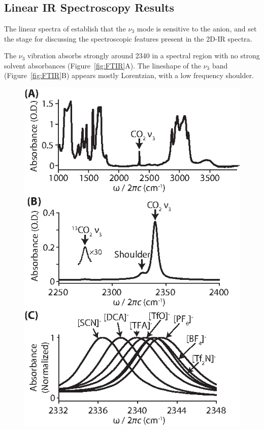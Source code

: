 {\section{\texorpdfstring{}{Results and Discussion}}

\subsection{Linear IR Spectroscopy Results}
\label{sec:anions_linear}
The linear spectra of  establish that the \(\nu_3\) mode is sensitive to the anion, and set the stage for discussing the spectroscopic features present in the 2D-IR spectra.

The \(\nu_3\) vibration absorbs strongly around \SI{2340}{\wavenumber} in a spectral region with no strong solvent absorbances (Figure~\ref{fig:FTIR}A). The lineshape of the \(\nu_3\) band (Figure~\ref{fig:FTIR}B) appears mostly Lorentzian, with a low frequency shoulder.
\begin{figure}
  \centering
  \includegraphics[scale=1.25]{./paper_01/fig2.eps}

\end{figure}}
